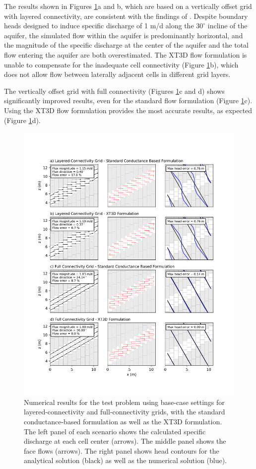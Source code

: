 \documentclass{article}
\begin{document}
The results shown in Figures \ref{fig:fig2}a and b, which are based on a vertically offset grid with layered connectivity, are consistent with the findings of \cite{bardot2023}. Despite boundary heads designed to induce specific discharge of 1 m/d along the $30^{\circ}$ incline of the aquifer, the simulated flow within the aquifer is predominantly horizontal, and the magnitude of the specific discharge at the center of the aquifer and the total flow entering the aquifer are both overestimated. The XT3D flow formulation is unable to compensate for the inadequate cell connectivity (Figure \ref{fig:fig2}b), which does not allow flow between laterally adjacent cells in different grid layers.

The vertically offset grid with full connectivity (Figures \ref{fig:fig2}c and d) shows significantly improved results, even for the standard flow formulation (Figure \ref{fig:fig2}c). Using the XT3D flow formulation provides the most accurate results, as expected (Figure \ref{fig:fig2}d).

\begin{figure}[p!]
	\begin{center}
	\includegraphics[scale=0.8]{../figures/fig2_paper.png}
	\caption{Numerical results for the test problem using base-case settings for layered-connectivity and full-connectivity grids, with the standard conductance-based formulation as well as the XT3D formulation. The left panel of each scenario shows the calculated specific discharge at each cell center (arrows). The middle panel shows the face flows (arrows). The right panel shows head contours for the analytical solution (black) as well as the numerical solution (blue).}
	\label{fig:fig2}
	\end{center}
\end{figure}
\end{document}
